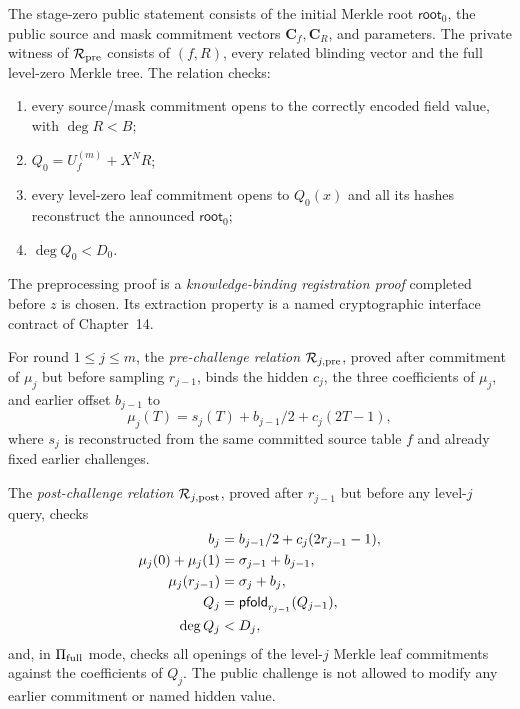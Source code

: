\begin{definition}\label{def:full:pre-relation}
The stage-zero public statement consists
of the initial Merkle root
$\mathsf{root}_0$, the public source
and mask commitment vectors
$\mathbf C_f,\mathbf C_R$, and parameters.
The private witness of
$\mathcal R_{\rm pre}$ consists of
$(f,R)$, every related blinding vector
and the full level-zero Merkle tree.
The relation checks:
\begin{enumerate}[label=\textup{(\roman*)}]
\item every source/mask commitment
opens to the correctly encoded
field value, with $\deg R<B$;
\item $Q_0=U_f^{(m)}+X^NR$;
\item every level-zero leaf
commitment opens to $Q_0(x)$
and all its hashes reconstruct
the announced $\mathsf{root}_0$;
\item $\deg Q_0<D_0$.
\end{enumerate}
The preprocessing proof is a
\emph{knowledge-binding registration
proof} completed before $z$ is
chosen. Its extraction property
is a named cryptographic interface
contract of Chapter~14.
\end{definition}

\begin{definition}\label{def:full:round-relations}
For round $1\le j\le m$, the
\emph{pre-challenge relation}
$\mathcal R_{j,\rm pre}$, proved
after commitment of $\mu_j$
but before sampling $r_{j-1}$,
binds the hidden $c_j$,
the three coefficients of
$\mu_j$, and earlier offset
$b_{j-1}$ to
\[
 \mu_j(T)=s_j(T)+
   b_{j-1}/2+c_j(2T-1),
\]
where $s_j$ is reconstructed
from the same committed source
table $f$ and already fixed
earlier challenges.

The \emph{post-challenge relation}
$\mathcal R_{j,\rm post}$, proved
after $r_{j-1}$ but before any
level-$j$ query, checks
\[
 \begin{aligned}
 b_j&=b_{j-1}/2+c_j(2r_{j-1}-1),\\
 \mu_j(0)+\mu_j(1)&=\sigma_{j-1}+b_{j-1},\\
 \mu_j(r_{j-1})&=\sigma_j+b_j,\\
 Q_j&=\mathsf{pfold}_{r_{j-1}}(Q_{j-1}),\\
 \deg Q_j&<D_j,
 \end{aligned}
\]
and, in $\Pi_{\rm full}$ mode,
checks all openings of the
level-$j$ Merkle leaf commitments
against the coefficients of $Q_j$.
The public challenge is not
allowed to modify any earlier
commitment or named hidden value.
\end{definition}

